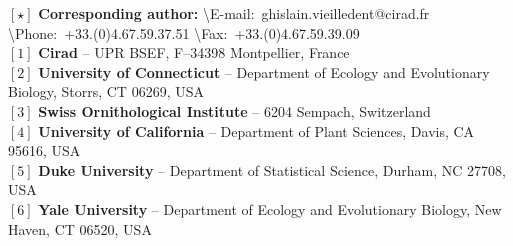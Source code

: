 \documentclass[a4paper, 12pt, leqno]{article}\usepackage[]{graphicx}\usepackage[]{color}
\begin{document}

{\footnotesize
  \begin{flushleft}
    $[\star]$ \textbf{Corresponding author:}
    \textbackslash{E-mail}:~ghislain.vieilledent@cirad.fr
    \textbackslash{Phone}:~+33.(0)4.67.59.37.51
    \textbackslash{Fax}:~+33.(0)4.67.59.39.09\\
    $[1]$ \textbf{Cirad} -- UPR BSEF, F–34398 Montpellier, France\\
    $[2]$ \textbf{University of Connecticut} -- Department of Ecology and Evolutionary
    Biology, Storrs, CT 06269, USA\\
    $[3]$ \textbf{Swiss Ornithological Institute} -- 6204 Sempach, Switzerland\\
    $[4]$ \textbf{University of California} -- Department of Plant Sciences, Davis,
    CA 95616, USA\\
    $[5]$ \textbf{Duke University} -- Department of Statistical Science, Durham, NC 27708, USA\\
    $[6]$ \textbf{Yale University} -- Department of Ecology and Evolutionary Biology, New Haven, CT 06520, USA\\
\end{flushleft}}

\newpage

\renewcommand{\abstractname}{Abstract}
\newcommand{\keywords}[1]{\par\noindent
{\small{\em Keywords\/}: #1}}
\end{document}
